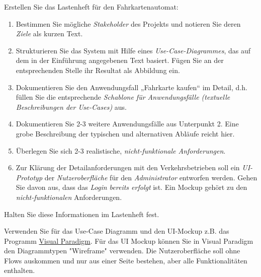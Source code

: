 \documentclass{abgabe}
\begin{document}
\begin{questions}
    Erstellen Sie das Lastenheft für den Fahrkartenautomat:
    \begin{enumerate}
        \item Bestimmen Sie mögliche \emph{Stakeholder} des Projekts und notieren Sie deren \emph{Ziele} als kurzen Text.
        \item Strukturieren Sie das System mit Hilfe eines \emph{Use-Case-Diagrammes}, das auf dem in der Einführung angegebenen Text basiert.
              Fügen Sie an der entsprechenden Stelle ihr Resultat als Abbildung ein.
        \item Dokumentieren Sie den Anwendungsfall „Fahrkarte kaufen“ im Detail, d.h. füllen Sie die entsprechende \emph{Schablone für Anwendungsfälle  (textuelle Beschreibungen der Use-Cases)} aus.
        \item Dokumentieren Sie 2-3 weitere Anwendungsfälle aus Unterpunkt 2. Eine grobe Beschreibung der typischen und alternativen Abläufe reicht hier.
        \item Überlegen Sie sich 2-3 realistische, \emph{nicht-funktionale Anforderungen}.
        \item Zur Klärung der Detailanforderungen mit den Verkehrsbetrieben soll ein \emph{UI-Prototyp} der \emph{Nutzeroberfläche} für den \emph{Administrator} entworfen werden.
              Gehen Sie davon aus, dass das \emph{Login bereits erfolgt} ist.
              Ein Mockup gehört zu den \emph{nicht-funktionalen} Anforderungen.
    \end{enumerate}

    Halten Sie diese Informationen im Lastenheft fest.

    Verwenden Sie für das Use-Case Diagramm und den UI-Mockup z.B. das Programm \href{https://www.ili.fh-aachen.de/ilias.php?baseClass=ilLinkResourceHandlerGUI&ref_id=341847&cmd=calldirectlink}{Visual Paradigm}. Für das UI Mockup können Sie in Visual Paradigm den Diagrammtypen "Wireframe" verwenden.
    Die Nutzeroberfläche soll ohne Flows auskommen und nur aus einer Seite bestehen, aber alle Funktionalitäten enthalten.
\end{questions}
\end{document}
